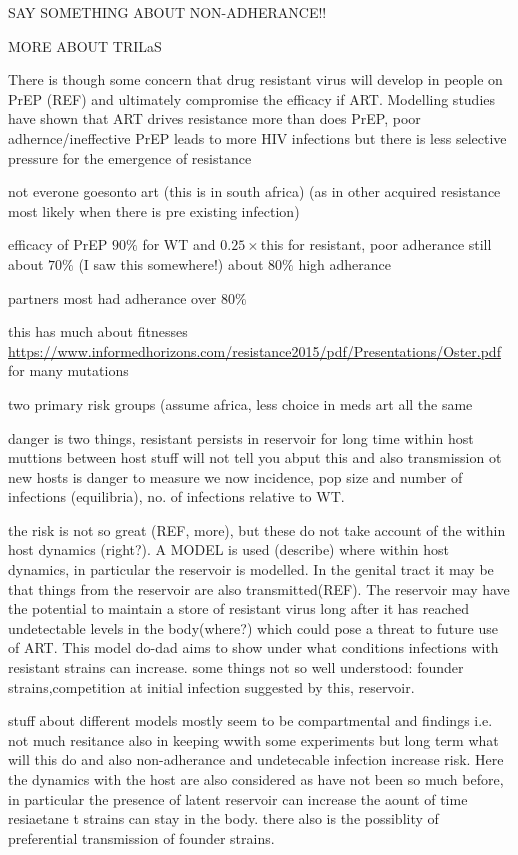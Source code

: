 \documentclass[DIV=15]{scrartcl}
\begin{document}
SAY SOMETHING ABOUT NON-ADHERANCE!!

MORE ABOUT TRILaS


There is though some concern that drug resistant virus will develop in people on PrEP (REF) and ultimately compromise the efficacy if ART. Modelling studies have shown that  ART drives resistance more than does PrEP, poor adhernce/ineffective PrEP leads to more HIV infections but there is less  selective pressure for the emergence of  resistance~\cite{abbas2013}


 not everone goesonto art (this is in south africa)  (as in other acquired resistance most likely when there is pre existing infection)

efficacy of PrEP $90\%$ for WT and $0.25\times$this for resistant, poor adherance still  about $70\%$ (I saw this somewhere!) about $80\%$ high adherance

partners most had adherance over $80\%$

this has much about fitnesses \url{https://www.informedhorizons.com/resistance2015/pdf/Presentations/Oster.pdf} for many mutations 



two primary risk groups (assume africa, less choice in meds art all the same


danger is two things, resistant persists in reservoir for long time within host muttions between host stuff will not tell you abput this and also transmission ot new hosts is danger to measure we now incidence, pop size and number of infections (equilibria), no. of infections relative to WT.




 the risk is not so great (REF, more), but these do not take account of the within host dynamics (right?).   A MODEL is used (describe) where within host dynamics, in particular the reservoir is modelled. In the genital tract it may be that things from the reservoir are also transmitted(REF). The reservoir may have  the potential to maintain a store of resistant virus long after it has reached undetectable levels  in the body(where?) which could pose a threat to future use of ART. This model do-dad aims to show under what conditions infections with resistant strains can increase. some things not so well understood: founder strains,competition at initial infection suggested by this,  reservoir.

\iffalse
stuff about different models mostly seem to be compartmental and findings i.e. not much resitance also in keeping wwith some experiments but long term what will this do and also non-adherance and undetecable infection increase risk. Here the dynamics with the host are also considered as have not been so much before, in particular the presence of  latent reservoir  can increase the aount of time resiaetane t strains can stay in the body. there also is the possiblity of preferential transmission of founder strains.
\end{document}
